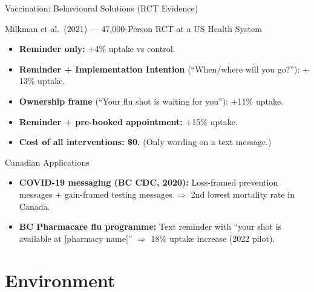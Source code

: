 \documentclass[aspectratio=169]{beamer}
\begin{document}
\begin{frame}{Vaccination: Behavioural Solutions (RCT Evidence)}
\begin{exampleblock}{Milkman et al.\ (2021) --- 47,000-Person RCT at a US Health System}
\begin{itemize}
  \item \textbf{Reminder only:} $+$4\% uptake vs control.
  \item \textbf{Reminder + Implementation Intention} (``When/where will you go?''): $+$13\% uptake.
  \item \textbf{Ownership frame} (``Your flu shot is waiting for you''): $+$11\% uptake.
  \item \textbf{Reminder + pre-booked appointment:} $+$15\% uptake.
  \item \textbf{Cost of all interventions: \$0.} (Only wording on a text message.)
\end{itemize}
\end{exampleblock}
\begin{block}{Canadian Applications}
\begin{itemize}
  \item \textbf{COVID-19 messaging (BC CDC, 2020):} Loss-framed prevention messages + gain-framed testing messages $\Rightarrow$ 2nd lowest mortality rate in Canada.
  \item \textbf{BC Pharmacare flu programme:} Text reminder with ``your shot is available at [pharmacy name]'' $\Rightarrow$ 18\% uptake increase (2022 pilot).
\end{itemize}
\end{block}
\end{frame}

\section{Environment}
\end{document}
